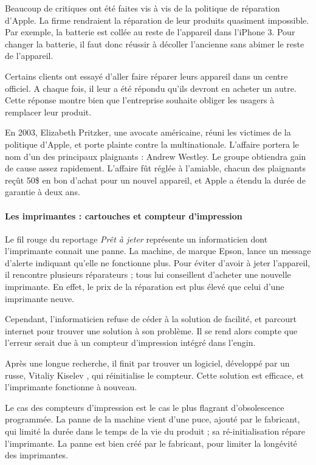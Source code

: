 \smallbreak 

Beaucoup de critiques ont été faites vis à vis de la politique de réparation d'Apple. La firme  rendraient la réparation de leur produits quasiment impossible. Par exemple, la batterie est collée au reste de l'appareil dans l'iPhone 3. Pour changer la batterie, il faut donc réussir à décoller l'ancienne sans abimer le reste de l'appareil.  

Certains clients ont essayé d'aller faire réparer leurs appareil dans un centre officiel. A chaque fois, il leur a été répondu qu'ils devront en acheter un autre. Cette réponse montre bien que l'entreprise souhaite obliger les usagers à remplacer leur produit. 

\smallbreak


En 2003, Elizabeth Pritzker, une avocate américaine, réuni les victimes de la politique d'Apple, et porte plainte contre la multinationale. L'affaire portera le nom d'un des principaux plaignants : Andrew Westley. Le groupe obtiendra gain de cause assez rapidement. L'affaire fût réglée à l'amiable, chacun des plaignants reçût 50\$ en bon d'achat pour un nouvel appareil, et Apple a étendu la durée de garantie à deux ans. 

\paragraph*{Les imprimantes : cartouches et compteur d'impression}

Le fil rouge du reportage \textit{Prêt à jeter} représente un informaticien dont l'imprimante connait une panne. La machine, de marque Epson, lance un message d'alerte indiquant qu'elle ne fonctionne plus. Pour éviter d'avoir à jeter l'appareil, il rencontre plusieurs réparateurs ; tous lui conseillent d'acheter une nouvelle imprimante. En effet, le prix de la réparation est plus élevé que celui d'une imprimante neuve. 

Cependant, l'informaticien refuse de céder à la solution de facilité, et parcourt internet pour trouver une solution à son problème. Il se rend alors compte que l'erreur serait due à un compteur d'impression intégré dans l'engin. 

Après une longue recherche, il finit par trouver un logiciel, développé par un russe, Vitaliy Kiselev , qui réinitialise le compteur. Cette solution est efficace, et l'imprimante fonctionne à nouveau.


Le cas des compteurs d'impression est le cas le plus flagrant d'obsolescence programmée. La panne de la machine vient d'une puce, ajouté par le fabricant, qui limité la durée dans le temps de la vie du produit ; sa ré-initialisation répare l'imprimante. La panne est bien créé par le fabricant, pour limiter la longévité  des imprimantes.

